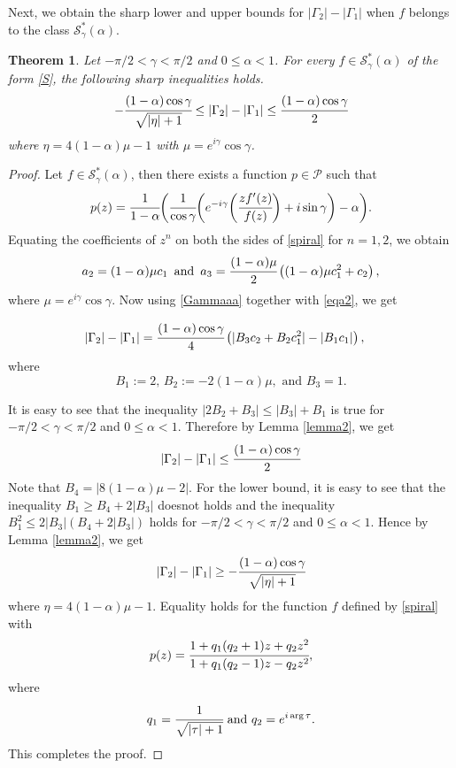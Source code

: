 \documentclass[a4paper,12pt]{amsart}
\newtheorem{theorem}{Theorem}[section]
\theoremstyle{definition}
\numberwithin{equation}{section}
\begin{document}
\noindent Next, we obtain the sharp lower and upper bounds for $|\Gamma_2|-|\Gamma_1|$ when $f$ belongs to the class  $\mathcal{S}^*_{\gamma}(\alpha)$.

\begin{theorem}\label{4444}
Let $-\pi/2< \gamma< \pi/2$ and $0\le \alpha <1$. For every $f\in \mathcal{S}^*_{\gamma}(\alpha)$ of the form \eqref{S}, the following sharp inequalities holds.
$$
-\cfrac{(1-\alpha)\cos \gamma}{\sqrt{|\eta|+1}} \leq|\Gamma_2|-|\Gamma_1| \leq \cfrac{(1-\alpha)\cos \gamma}{2}
$$
\noindent where $\eta=4(1-\alpha)\mu-1$ with $\mu=e^{i\gamma}\cos \gamma$.
\end{theorem}

\begin{proof}
Let $f\in \mathcal{S}^*_{\gamma}(\alpha)$, then there exists a function $p\in \mathcal{P}$ such that
\begin{equation}\label{spiral}
p(z)=\cfrac{1}{1-\alpha}\bigg( \cfrac{1}{\cos \gamma}\bigg(e^{-i\gamma} \bigg(\cfrac{zf'(z)}{f(z)}\bigg)+i\sin \gamma\bigg)-\alpha\bigg).
\end{equation}
Equating the coefficients of $z^n$ on both the sides of \eqref{spiral} for $n=1,2$, we obtain
\begin{equation}\label{eqa2}
a_2=(1-\alpha)\mu c_1 \,\,\, \text{and} \,\,\,
	a_3=\cfrac{(1-\alpha)\mu}{2}\left((1-\alpha)\mu c_1^2+ c_2\right),
\end{equation}
where $\mu=e^{i\gamma}\cos \gamma$. Now using \eqref{Gammaaa} together with \eqref{eqa2}, we get

\begin{align}\label{cB2}
	|\Gamma_2|-|\Gamma_1|	&=\cfrac{(1-\alpha)\cos \gamma}{4}\left(|B_3c_2+B_2 c_1^2|-|B_1c_1|\right),
\end{align}
where
$$
B_1:=2,\,B_2:=-2(1-\alpha)\mu, \mbox{ and }B_3=1.
$$

\noindent It is easy to see that the inequality $|2B_2+B_3| \leq |B_3|+B_1$ is true for $-\pi/2< \gamma< \pi/2$ and $0\le \alpha <1$. Therefore by Lemma \ref{lemma2}, we get 
$$
|\Gamma_2|-|\Gamma_1| \leq \cfrac{(1-\alpha)\cos \gamma}{2}
$$
\noindent Note that $B_4=|8(1-\alpha)\mu-2|$. For the lower bound, it is easy to see that  the inequality $B_1 \geq B_4+2|B_3|$ doesnot holds and the inequality $B_1^2 \leq 2|B_3|(B_4+2|B_3|)$ holds for $-\pi/2< \gamma< \pi/2$ and $0\le \alpha <1$. Hence by Lemma \ref{lemma2}, we get 
\begin{equation}
|\Gamma_2|-|\Gamma_1|\geq -\cfrac{(1-\alpha)\cos \gamma}{\sqrt{|\eta|+1}}
\end{equation}
\noindent where $\eta=4(1-\alpha)\mu-1$. Equality holds for the function $f$ defined by \eqref{spiral} with
\begin{equation}\label{eqcp(z)}
p(z)=\cfrac{1+q_1(q_2+1)z+q_2z^2}{1+q_1(q_2-1)z-q_2z^2},
\end{equation}
where
$$
q_1=\cfrac{1}{\sqrt{|\tau|+1}} \mbox{ and } q_2=e^{i\arg \tau}.
$$
  This completes the proof.
\end{proof}
\end{document}
